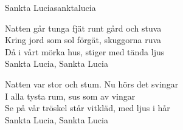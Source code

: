 \begin{song}{Sankta Lucia}{sanktalucia}
\begin{vers}
Natten går tunga fjät runt gård och stuva\\
Kring jord som sol förgät, skuggorna ruva\\
Då i vårt mörka hus, stiger med tända ljus\\
Sankta Lucia, Sankta Lucia\\
\end{vers}
\begin{vers}
Natten var stor och stum. Nu hörs det svingar\\
I alla tysta rum, sus som av vingar\\
Se på vår tröskel står vitkläd, med ljus i hår\\
Sankta Lucia, Sankta Lucia\\
\end{vers}
\end{song}
